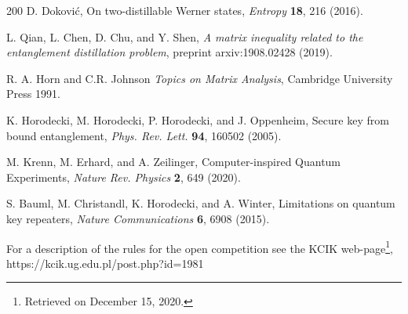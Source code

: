 \documentclass[english,aps,pra,nofootinbib,twocolumn,superscriptaddress]{revtex4-1}
\newcommand{\1}{{\rm 1\hspace{-0.9mm}l}}
\begin{document}
\begin{thebibliography}{200}
 D.  Dokovi{\' c}, 
 On two-distillable Werner states,
{\sl Entropy} {\bf  18}, 216 (2016).

  L. Qian, L. Chen, D. Chu, and Y. Shen, 
{\sl A matrix inequality related to the entanglement distillation problem}, 
preprint arxiv:1908.02428  (2019).



R. A. Horn and C.R. Johnson {\sl Topics on Matrix Analysis}, Cambridge University Press 1991.

K. Horodecki, M. Horodecki, P. Horodecki, and J. Oppenheim,
Secure key from bound entanglement,
{\sl Phys. Rev. Lett.} {\bf  94}, 160502 (2005).


 M. Krenn, M. Erhard, and A. Zeilinger,
Computer-inspired Quantum Experiments,
{\sl Nature Rev. Physics} {\bf 2}, 649 (2020). 

  S. Bauml, M. Christandl, K. Horodecki, and A. Winter,
Limitations on quantum key repeaters,
{\sl Nature Communications} {\bf 6}, 6908 (2015). 

 For a description of the
rules for the open competition see the  KCIK web-page\footnote{Retrieved on December 15, 2020.},
https://kcik.ug.edu.pl/post.php?id=1981
  

\end{thebibliography}
\end{document}
